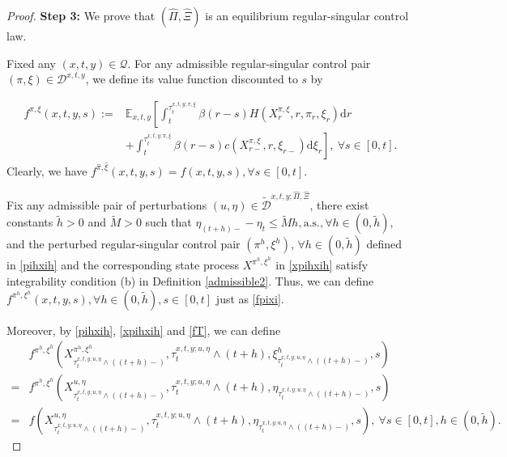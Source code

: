 \documentclass[10pt,a4paper]{amsart}
\begin{document}
\begin{proof}
{\bf Step 3:} We prove that $(\hat{\Pi},\hat{\Xi})$ is an equilibrium regular-singular control law.

Fixed any $(x,t,y)\in\mathcal{Q}$. For any admissible regular-singular control pair $(\pi,\xi)\in\mathcal{D}^{x,t,y}$, we define its value function discounted to $s$ by

\begin{equation}\label{fpixi}
\begin{aligned}
f^{\pi,\xi}(x,t,y,s):=&\mathbb{E}_{x,t,y}\left[\int_t^{\tau^{x,t,y;\pi,\xi}_{t}} \beta(r-s) H\left(X^{\pi,\xi}_r, r,\pi_r, \xi_r \right) \mathrm{d} r\right. \\
& \left.+\int_t^{\tau^{x,t,y;\pi,\xi}_{t}} \beta(r-s) c\left(X^{\pi,\xi}_{r-}, r, \xi_{r-}\right) \mathrm{d}\xi_r \right],\ \forall  s\in[0,t].
\end{aligned}
\end{equation}
Clearly, we have $f^{\hat\pi,\hat\xi}(x,t,y,s)=f(x,t,y,s), \forall s\in [0,t]$. 

Fix any admissible pair of perturbations $(u,\eta)\in\mathcal{\tilde D}^{x,t,y;\hat\Pi,\hat\Xi}$, there exist constants $\tilde{h}>0$ and $\tilde{M}>0$ such that $\eta_{(t+h)-}-\eta_{t}\le \tilde{M}h, \text{a.s.}, \forall h\in(0,\tilde{h})$, and the perturbed regular-singular control pair $\left(\pi^{h},\xi^{h}\right)$, $\forall h\in(0,\tilde{h})$ defined in \eqref{pihxih} and the corresponding state process $X^{\pi^{h},\xi^{h}}$ in \eqref{xpihxih} satisfy integrability condition (b) in Definition \ref{admissible2}. Thus, we can define $f^{\pi^{h},\xi^{h}}(x,t,y,s), \forall h\in(0,\tilde{h}), s\in[0,t]$ just as \eqref{fpixi}. 

Moreover, by \eqref{pihxih}, \eqref{xpihxih} and \eqref{fT}, we can define 
\begin{equation}\begin{aligned}
&f^{\pi^{h},\xi^{h}}\left(X^{\pi^{h},\xi^{h}}_{\tau^{x,t,y;u,\eta}_{t}\wedge((t+h)-)},\tau^{x,t,y;u,\eta}_{t}\wedge(t+h),\xi^{h}_{\tau^{x,t,y;u,\eta}_{t}\wedge((t+h)-)},s\right)\\=&f^{\pi^{h},\xi^{h}}\left(X^{u,\eta}_{\tau^{x,t,y;u,\eta}_{t}\wedge((t+h)-)},\tau^{x,t,y;u,\eta}_{t}\wedge(t+h),\eta_{\tau^{x,t,y;u,\eta}_{t}\wedge((t+h)-)},s\right)\\=&f\left(X^{u,\eta}_{\tau^{x,t,y;u,\eta}_{t}\wedge((t+h)-)},\tau^{x,t,y;u,\eta}_{t}\wedge(t+h),\eta_{\tau^{x,t,y;u,\eta}_{t}\wedge((t+h)-)},s\right),\ \forall s\in[0,t], h\in(0,\tilde{h}).
\end{aligned}\nonumber\end{equation}


\end{proof}
\end{document}

